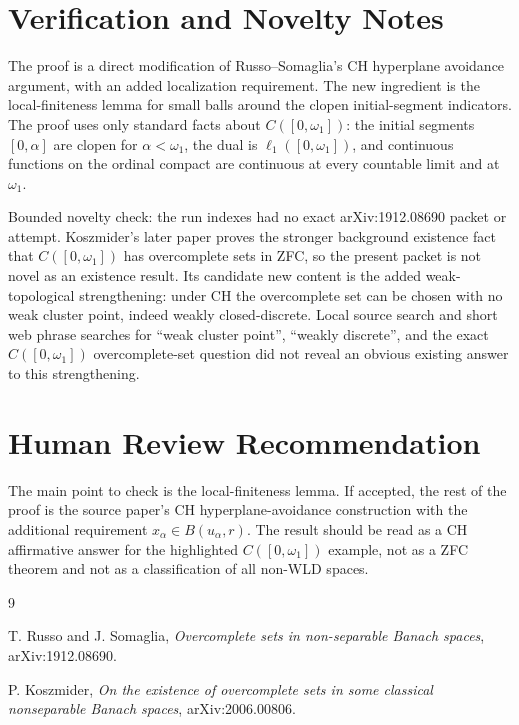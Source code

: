 \documentclass[11pt]{article}
\begin{document}
\section*{Verification and Novelty Notes}

The proof is a direct modification of Russo--Somaglia's CH hyperplane
avoidance argument, with an added localization requirement. The new ingredient
is the local-finiteness lemma for small balls around the clopen initial-segment
indicators. The proof uses only standard facts about \(C([0,\omega_1])\):
the initial segments \([0,\alpha]\) are clopen for \(\alpha<\omega_1\), the
dual is \(\ell_1([0,\omega_1])\), and continuous functions on the ordinal
compact are continuous at every countable limit and at \(\omega_1\).

Bounded novelty check: the run indexes had no exact arXiv:1912.08690 packet
or attempt. Koszmider's later paper \cite{koszmider} proves the stronger
background existence fact that \(C([0,\omega_1])\) has overcomplete sets in
ZFC, so the present packet is not novel as an existence result. Its candidate
new content is the added weak-topological strengthening: under CH the
overcomplete set can be chosen with no weak cluster point, indeed weakly
closed-discrete. Local source search and short web phrase searches for
``weak cluster point'', ``weakly discrete'', and the exact
\(C([0,\omega_1])\) overcomplete-set question did not reveal an obvious
existing answer to this strengthening.

\section*{Human Review Recommendation}

The main point to check is the local-finiteness lemma. If accepted, the rest
of the proof is the source paper's CH hyperplane-avoidance construction with
the additional requirement \(x_\alpha\in B(u_\alpha,r)\). The result should be
read as a CH affirmative answer for the highlighted \(C([0,\omega_1])\)
example, not as a ZFC theorem and not as a classification of all non-WLD
spaces.

\begin{thebibliography}{9}

T. Russo and J. Somaglia,
\emph{Overcomplete sets in non-separable Banach spaces},
arXiv:1912.08690.

P. Koszmider,
\emph{On the existence of overcomplete sets in some classical nonseparable
Banach spaces},
arXiv:2006.00806.

\end{thebibliography}
\end{document}

